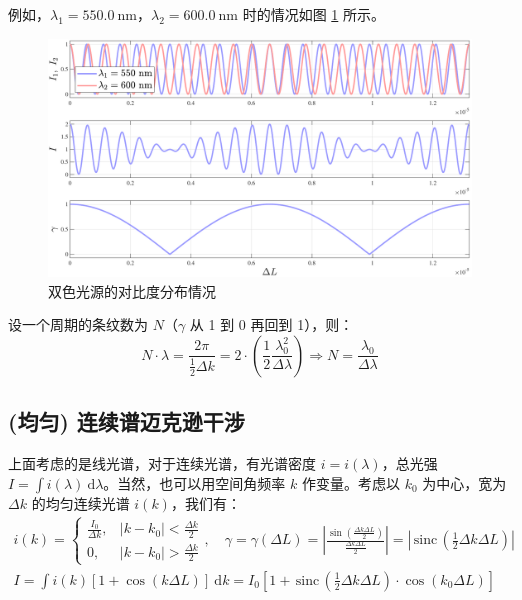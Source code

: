 \documentclass[UTF8]{report}
\def\sinc{\mathrm{\,sinc}\,}
\theoremstyle{MyLineTheoremStyle} %
\theoremstyle{MyBlockTheoremStyle} %
\theoremstyle{MySubsubsectionStyle} %
\begin{document}
例如，$\lambda_1 = 550.0\ \mathrm{nm}$，$\lambda_2 = 600.0\ \mathrm{nm}$ 时的情况如图 \ref{双色光源的对比度分布情况} 所示。

\begin{figure}[H]\centering
\includegraphics[width=0.85\columnwidth]{assets/3/迈克尔逊干涉_双色光源.pdf}
\caption{ 双色光源的对比度分布情况}\label{双色光源的对比度分布情况}
\end{figure}


设一个周期的条纹数为 $N$（$\gamma$ 从 1 到 0 再回到 1），则：
\begin{equation}
N \cdot \lambda = \frac{2 \pi}{\frac{1}{2}\Delta k} = 2 \cdot \left(\frac{1}{2} \frac{\lambda_0^2}{\Delta \lambda}\right) \Longrightarrow N = \frac{\lambda_0}{\Delta \lambda}
\end{equation}


\subsection{(均匀) 连续谱迈克逊干涉}

上面考虑的是线光谱，对于连续光谱，有光谱密度 $i = i(\lambda)$，总光强 $I = \int i(\lambda)\ \mathrm{d}\lambda$。当然，也可以用空间角频率 $k$ 作变量。考虑以 $k_0$ 为中心，宽为 $\Delta k$ 的均匀连续光谱 $i(k)$，我们有：
\begin{gather}\label{光谱宽度对对比度的影响}
i (k) = 
\begin{cases}
    \frac{I_0}{\Delta k}, & |k - k_0| < \frac{\Delta k}{2} \\
    0, & |k - k_0| > \frac{\Delta k}{2}
\end{cases} ,\quad \gamma = \gamma(\Delta L) = \left| \frac{\sin \left(\frac{\Delta k \Delta L}{2}\right)}{\frac{\Delta k \Delta L}{2}} \right| = \left| \sinc \left( \frac{1}{2}\Delta k \Delta L\right) \right| 
\\
I = \int i(k)\left[1 + \cos (k \Delta L)\right] \ \mathrm{d}k = I_0 \left[ 1 + \sinc \left( \frac{1}{2}\Delta k \Delta L\right) \cdot \cos (k_0 \Delta L)\right]
\end{gather}
\end{document}
